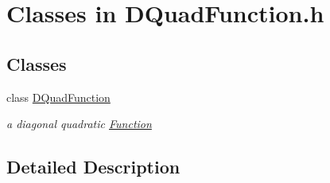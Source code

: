 \hypertarget{group___d_quad_fun___c_l_a_s_s_e_s}{}\section{Classes in D\+Quad\+Function.\+h}
\label{group___d_quad_fun___c_l_a_s_s_e_s}
\subsection*{Classes}
\begin{DoxyCompactItemize}
\item 
class \mbox{\hyperlink{class_s_m_spp__di__unipi__it_1_1_d_quad_function}{D\+Quad\+Function}}
\begin{DoxyCompactList}\small\item\em a diagonal quadratic \mbox{\hyperlink{class_s_m_spp__di__unipi__it_1_1_function}{Function}} \end{DoxyCompactList}\end{DoxyCompactItemize}


\subsection{Detailed Description}
